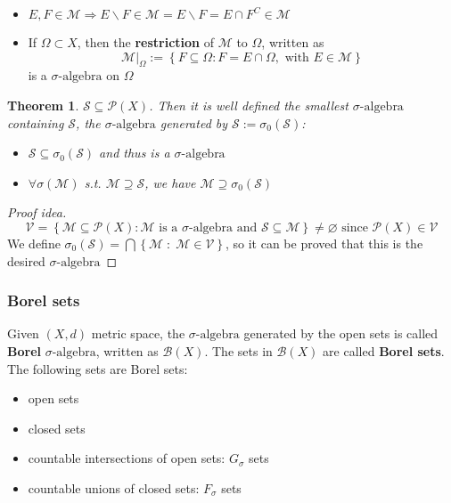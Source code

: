 \documentclass[a4paper,12pt]{article}
\theoremstyle{break}
\newtheorem{theorem}{Theorem}[section]
\let\emptyset\varnothing
\newcommand{\sigalg}{\sigma\mbox{-algebra}}
\numberwithin{equation}{section}
\begin{document}
\begin{itemize}
    \item \(E, F \in \mathcal{M} \Longrightarrow E \backslash F \in \mathcal{M} = E \backslash F = E \cap F^C \in \mathcal{M}\)
    \item If \(\Omega \subset X\), then the \textbf{restriction} of \(\mathcal{M}\) to \(\Omega\), written as \[\mathcal{M}\vert_{\Omega} := \left\lbrace F \subseteq \Omega: F = E \cap \Omega, \mbox{ with } E \in \mathcal{M} \right\rbrace\] is a \(\sigalg\) on \(\Omega\)
\end{itemize}
\begin{theorem}
    \(\mathcal{S} \subseteq \mathcal{P}(X)\). Then it is well defined the smallest \(\sigalg\) containing \(\mathcal{S}\), the \(\sigalg\) generated by \(\mathcal{S} := \sigma_0(\mathcal{S})\):
    \begin{itemize}
        \item \(\mathcal{S} \subseteq \sigma_0(\mathcal{S})\) and thus is a \(\sigalg\)
        \item \(\forall \sigma(\mathcal{M})\) s.t. \(\mathcal{M} \supseteq \mathcal{S}\), we have \(\mathcal{M} \supseteq \sigma_0(\mathcal{S})\)
    \end{itemize}
\end{theorem}
\begin{proof}[Proof idea]
    \[
        \mathcal{V} = \left\lbrace \mathcal{M} \subseteq \mathcal{P}(X): \mathcal{M} \mbox{ is a } \sigalg \mbox{ and }\mathcal{S} \subseteq \mathcal{M}\right\rbrace \not = \emptyset \mbox{ since } \mathcal{P}(X) \in \mathcal{V}
    \]
    We define \(\sigma_0(\mathcal{S}) = \bigcap \left\lbrace \mathcal{M} \; : \; \mathcal{M} \in \mathcal{V}\right\rbrace\), so it can be proved that this is the desired \(\sigalg\)
\end{proof}
\subsubsection*{Borel sets}
Given \((X, d)\) metric space, the \(\sigalg\) generated by the open sets is called \textbf{Borel} \(\sigalg\), written as \(\mathcal{B}(X)\). The sets in \(\mathcal{B}(X)\) are called \textbf{Borel sets}. The following sets are Borel sets:
\begin{itemize}
    \item open sets
    \item closed sets
    \item countable intersections of open sets: \(G_{\sigma}\) sets
    \item countable unions of closed sets: \(F_{\sigma}\) sets
\end{itemize}
\end{document}
